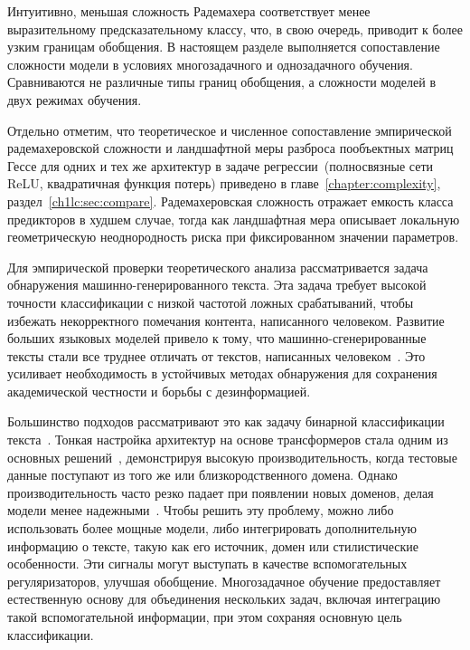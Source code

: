 Интуитивно, меньшая сложность Радемахера соответствует менее выразительному предсказательному классу, что, в свою очередь, приводит к более узким границам обобщения.
В настоящем разделе выполняется сопоставление сложности модели в условиях многозадачного и однозадачного обучения.
Сравниваются не различные типы границ обобщения, а сложности моделей в двух режимах обучения.

Отдельно отметим, что теоретическое и численное сопоставление эмпирической радемахеровской сложности и ландшафтной меры разброса пообъектных матриц Гессе для одних и тех же архитектур в задаче регрессии~(полносвязные сети ReLU, квадратичная функция потерь) приведено в главе~\ref{chapter:complexity}, раздел~\ref{ch1lc:sec:compare}.
Радемахеровская сложность отражает емкость класса предикторов в худшем случае, тогда как ландшафтная мера описывает локальную геометрическую неоднородность риска при фиксированном значении параметров.

Для эмпирической проверки теоретического анализа рассматривается задача обнаружения машинно-генерированного текста.
Эта задача требует высокой точности классификации с низкой частотой ложных срабатываний, чтобы избежать некорректного помечания контента, написанного человеком.
Развитие больших языковых моделей привело к тому, что машинно-сгенерированные тексты стали все труднее отличать от текстов, написанных человеком~\cite{zellers2019grover, solaiman2019gpt2}. Это усиливает необходимость в устойчивых методах обнаружения для сохранения академической честности и борьбы с дезинформацией.

Большинство подходов рассматривают это как задачу бинарной классификации текста~\cite{jawahar2020automatic, uchendu2021authorship}.
Тонкая настройка архитектур на основе трансформеров стала одним из основных решений~\cite{valiaiev2024detectionmachinegeneratedtextliterature}, демонстрируя высокую производительность, когда тестовые данные поступают из того же или близкородственного домена.
Однако производительность часто резко падает при появлении новых доменов, делая модели менее надежными~\cite{anonymous2025}.
Чтобы решить эту проблему, можно либо использовать более мощные модели, либо интегрировать дополнительную информацию о тексте, такую как его источник, домен или стилистические особенности.
Эти сигналы могут выступать в качестве вспомогательных регуляризаторов, улучшая обобщение.
Многозадачное обучение предоставляет естественную основу для объединения нескольких задач, включая интеграцию такой вспомогательной информации, при этом сохраняя основную цель классификации.

